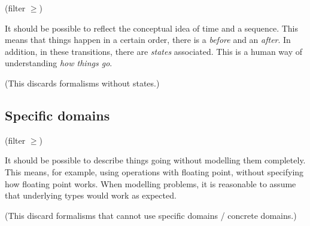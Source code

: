 (filter $\geq $)

It should be possible to reflect the conceptual idea of time and a sequence.
This means that things happen in a certain order, there is a \textit{before} and an \textit{after}.
In addition, in these transitions, there are \textit{states} associated.
This is a human way of understanding \textit{how things go}.

(This discards formalisms without states.)

\subsection{Specific domains}

(filter $\geq $)

It should be possible to describe things going without modelling them completely.
This means, for example, using operations with floating point, without specifying how floating point works.
When modelling problems, it is reasonable to assume that underlying types would work as expected.

(This discard formalisms that cannot use specific domains / concrete domains.)



